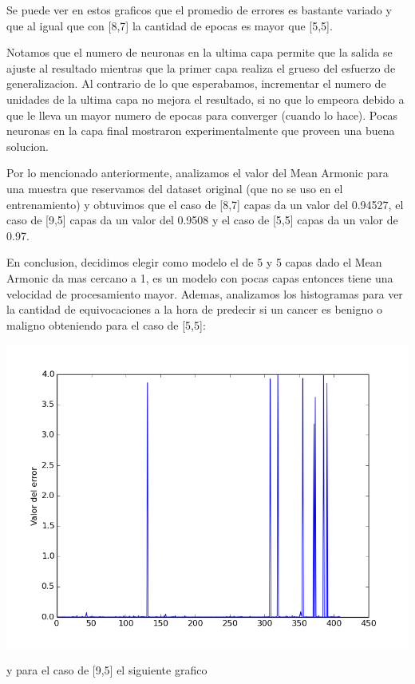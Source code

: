 Se puede ver en estos graficos que el promedio de errores es bastante variado y que al igual que con [8,7] la cantidad de epocas es mayor que [5,5].

Notamos que el numero de neuronas en la ultima capa permite que la salida se ajuste al resultado mientras que la primer capa realiza el grueso del esfuerzo de generalizacion. Al contrario de lo que esperabamos, incrementar el numero de unidades de la ultima capa no mejora el resultado, si no que lo empeora debido a que le lleva un mayor numero de epocas para converger (cuando lo hace). Pocas neuronas en la capa final mostraron experimentalmente que proveen una buena solucion.

Por lo mencionado anteriormente, analizamos el valor del Mean Armonic para una muestra que reservamos del dataset original (que no se uso en el entrenamiento) y obtuvimos que el caso de [8,7] capas da un valor del 0.94527, el caso de [9,5] capas da un valor del 0.9508 y el caso de [5,5] capas da un valor de 0.97.


En conclusion, decidimos elegir como modelo el de 5 y 5 capas dado el Mean Armonic da mas cercano a 1, es un modelo con pocas capas entonces tiene una velocidad de procesamiento mayor.
Ademas, analizamos los histogramas para ver la cantidad de equivocaciones a la hora de predecir si un cancer es benigno o maligno obteniendo para el caso de [5,5]:

\begin{center}
\includegraphics[scale=0.5]{img/histogramaej155}
\end{center}

y para el caso de [9,5] el siguiente grafico


